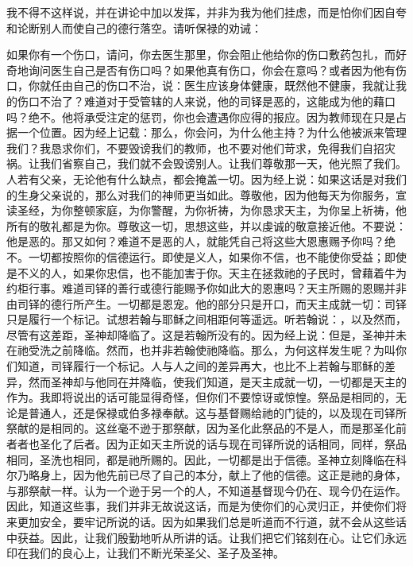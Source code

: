 我不得不这样说，并在讲论中加以发挥，并非为我为他们挂虑，而是怕你们因自夸和论断别人而使自己的德行落空。请听保禄的劝诫：\par

如果你有一个伤口，请问，你去医生那里，你会阻止他给你的伤口敷药包扎，而好奇地询问医生自己是否有伤口吗？如果他真有伤口，你会在意吗？或者因为他有伤口，你就任由自己的伤口不治，说：医生应该身体健康，既然他不健康，我就让我的伤口不治了？难道对于受管辖的人来说，他的司铎是恶的，这能成为他的藉口吗？绝不。他将承受注定的惩罚，你也会遭遇你应得的报应。因为教师现在只是占据一个位置。因为经上记载：那么，你会问，为什么他主持？为什么他被派来管理我们？我恳求你们，不要毁谤我们的教师，也不要对他们苛求，免得我们自招灾祸。让我们省察自己，我们就不会毁谤别人。让我们尊敬那一天，他光照了我们。人若有父亲，无论他有什么缺点，都会掩盖一切。因为经上说：如果这话是对我们的生身父亲说的，那么对我们的神师更当如此。尊敬他，因为他每天为你服务，宣读圣经，为你整顿家庭，为你警醒，为你祈祷，为你恳求天主，为你呈上祈祷，他所有的敬礼都是为你。尊敬这一切，思想这些，并以虔诚的敬意接近他。不要说：他是恶的。那又如何？难道不是恶的人，就能凭自己将这些大恩惠赐予你吗？绝不。一切都按照你的信德运行。即使是义人，如果你不信，也不能使你受益；即使是不义的人，如果你忠信，也不能加害于你。天主在拯救祂的子民时，曾藉着牛为约柜行事。难道司铎的善行或德行能赐予你如此大的恩惠吗？天主所赐的恩赐并非由司铎的德行所产生。一切都是恩宠。他的部分只是开口，而天主成就一切：司铎只是履行一个标记。试想若翰与耶稣之间相距何等遥远。听若翰说：，以及然而，尽管有这差距，圣神却降临了。这是若翰所没有的。因为经上说：但是，圣神并未在祂受洗之前降临。然而，也并非若翰使祂降临。那么，为何这样发生呢？为叫你们知道，司铎履行一个标记。人与人之间的差异再大，也比不上若翰与耶稣的差异，然而圣神却与他同在并降临，使我们知道，是天主成就一切，一切都是天主的作为。我即将说出的话可能显得奇怪，但你们不要惊讶或惊惶。祭品是相同的，无论是普通人，还是保禄或伯多禄奉献。这与基督赐给祂的门徒的，以及现在司铎所祭献的是相同的。这丝毫不逊于那祭献，因为圣化此祭品的不是人，而是那圣化前者者也圣化了后者。因为正如天主所说的话与现在司铎所说的话相同，同样，祭品相同，圣洗也相同，都是祂所赐的。因此，一切都是出于信德。圣神立刻降临在科尔乃略身上，因为他先前已尽了自己的本分，献上了他的信德。这正是祂的身体，与那祭献一样。认为一个逊于另一个的人，不知道基督现今仍在、现今仍在运作。因此，知道这些事，我们并非无故说这话，而是为使你们的心灵归正，并使你们将来更加安全，要牢记所说的话。因为如果我们总是听道而不行道，就不会从这些话中获益。因此，让我们殷勤地听从所讲的话。让我们把它们铭刻在心。让它们永远印在我们的良心上，让我们不断光荣圣父、圣子及圣神。\par

